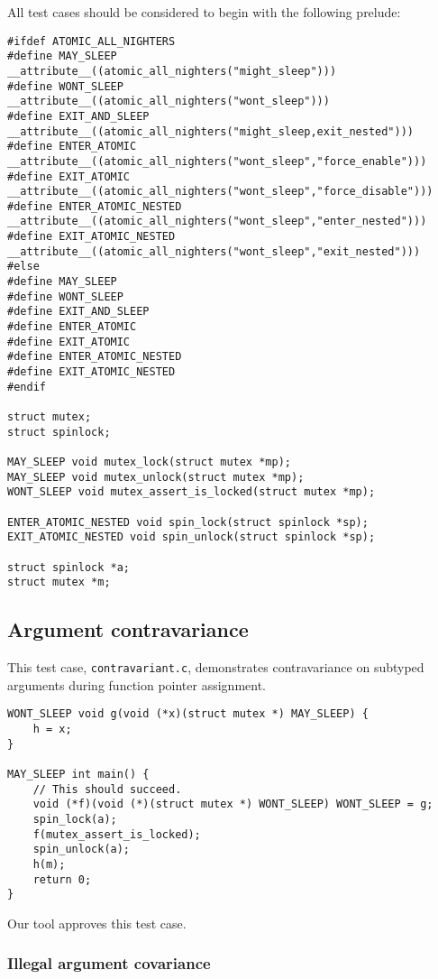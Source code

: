 \documentclass{article}
\begin{document}
All test cases should be considered to begin with the following prelude:

\begin{verbatim}
#ifdef ATOMIC_ALL_NIGHTERS
#define MAY_SLEEP           __attribute__((atomic_all_nighters("might_sleep")))
#define WONT_SLEEP          __attribute__((atomic_all_nighters("wont_sleep")))
#define EXIT_AND_SLEEP      __attribute__((atomic_all_nighters("might_sleep,exit_nested")))
#define ENTER_ATOMIC        __attribute__((atomic_all_nighters("wont_sleep","force_enable")))
#define EXIT_ATOMIC         __attribute__((atomic_all_nighters("wont_sleep","force_disable")))
#define ENTER_ATOMIC_NESTED __attribute__((atomic_all_nighters("wont_sleep","enter_nested")))
#define EXIT_ATOMIC_NESTED  __attribute__((atomic_all_nighters("wont_sleep","exit_nested")))
#else
#define MAY_SLEEP
#define WONT_SLEEP
#define EXIT_AND_SLEEP
#define ENTER_ATOMIC
#define EXIT_ATOMIC
#define ENTER_ATOMIC_NESTED
#define EXIT_ATOMIC_NESTED
#endif

struct mutex;
struct spinlock;

MAY_SLEEP void mutex_lock(struct mutex *mp);
MAY_SLEEP void mutex_unlock(struct mutex *mp);
WONT_SLEEP void mutex_assert_is_locked(struct mutex *mp);

ENTER_ATOMIC_NESTED void spin_lock(struct spinlock *sp);
EXIT_ATOMIC_NESTED void spin_unlock(struct spinlock *sp);

struct spinlock *a;
struct mutex *m;
\end{verbatim}

\subsection{Argument contravariance}

This test case, \texttt{contravariant.c}, demonstrates contravariance on subtyped arguments during function pointer assignment.

\begin{verbatim}
WONT_SLEEP void g(void (*x)(struct mutex *) MAY_SLEEP) {
    h = x;
}

MAY_SLEEP int main() {
    // This should succeed.
    void (*f)(void (*)(struct mutex *) WONT_SLEEP) WONT_SLEEP = g;
    spin_lock(a);
    f(mutex_assert_is_locked);
    spin_unlock(a);
    h(m);
    return 0;
}
\end{verbatim}

Our tool approves this test case.

\subsubsection{Illegal argument covariance}
\end{document}
